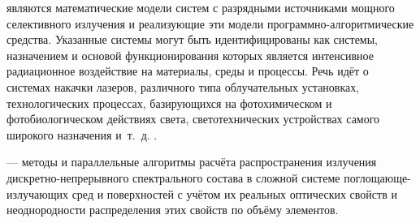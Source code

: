 




 являются математические модели систем с разрядными источниками мощного селективного излучения и реализующие эти модели программно-алгоритмические средства.
Указанные системы могут быть идентифицированы как системы, назначением и основой функционирования которых является интенсивное радиационное воздействие на материалы, среды и процессы.
Речь идёт о системах накачки лазеров, различного типа облучательных установках, технологических процессах, базирующихся на фотохимическом и фотобиологическом действиях света, светотехнических устройствах самого широкого назначения и~т.~д. \cite{article-1-marshak, article-2-hancock, article-3-moreau}.

 — методы и параллельные алгоритмы расчёта распространения излучения дискретно-непрерывного спектрального состава в сложной системе поглощающе-излучающих сред и поверхностей с учётом их реальных оптических свойств и неоднородности распределения этих свойств по объёму элементов.

